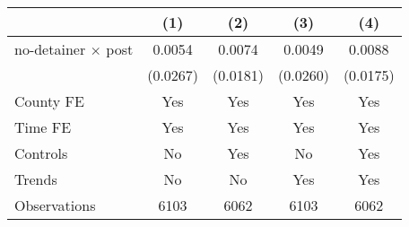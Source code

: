 {
\def\sym#1{\ifmmode^{#1}\else\(^{#1}\)\fi}
\begin{tabular}{l*{4}{c}}
\hline\hline
                    &\multicolumn{1}{c}{(1)}         &\multicolumn{1}{c}{(2)}         &\multicolumn{1}{c}{(3)}         &\multicolumn{1}{c}{(4)}         \\
\hline
no-detainer $\times$ post&      0.0054         &      0.0074         &      0.0049         &      0.0088         \\
                    &    (0.0267)         &    (0.0181)         &    (0.0260)         &    (0.0175)         \\
[1em]
County FE           &         Yes         &         Yes         &         Yes         &         Yes         \\
[1em]
Time FE             &         Yes         &         Yes         &         Yes         &         Yes         \\
[1em]
Controls            &          No         &         Yes         &          No         &         Yes         \\
[1em]
Trends              &          No         &          No         &         Yes         &         Yes         \\
\hline
Observations        &        6103         &        6062         &        6103         &        6062         \\
\hline\hline
\end{tabular}
}

